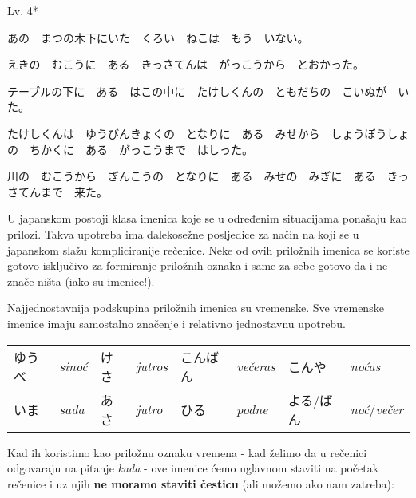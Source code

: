 	\begin{mondai}{Lv. 4*}
		\item あの　まつの木下にいた　くろい　ねこは　もう　いない。
		\item えきの　むこうに　ある　きっさてんは　がっこうから　とおかった。
		\item テーブルの下に　ある　はこの中に　たけしくんの　ともだちの　こいぬが　いた。
		\item たけしくんは　ゆうびんきょくの　となりに　ある　みせから　しょうぼうしょの　ちかくに　ある　がっこうまで　はしった。
		\item 川の　むこうから　ぎんこうの　となりに　ある　みせの　みぎに　ある　きっさてんまで　来た。
	\end{mondai}


\newpage
{}

	
	
	U japanskom postoji klasa imenica koje se u određenim situacijama ponašaju kao prilozi. Takva upotreba ima dalekosežne posljedice za način na koji se u japanskom slažu kompliciranije rečenice. Neke od ovih priložnih imenica se koriste gotovo isključivo za formiranje priložnih oznaka i same za sebe gotovo da i ne znače ništa (iako su imenice!).
	
	Najjednostavnija podskupina priložnih imenica su vremenske. Sve vremenske imenice imaju samostalno značenje i relativno jednostavnu upotrebu.
	
	
	\begin{tabular}{l l l l l l l l}
		ゆうべ & \textit{sinoć} & けさ & \textit{jutros} & こんばん & \textit{večeras} & こんや & \textit{noćas}\\
 		いま & \textit{sada} & あさ & \textit{jutro} & ひる & \textit{podne} & よる/ばん & \textit{noć}/\textit{večer}\\
	\end{tabular}

	\vspace{10pt}
	Kad ih koristimo kao priložnu oznaku vremena - kad želimo da u rečenici odgovaraju na pitanje \textit{kada} - ove imenice ćemo uglavnom staviti na početak rečenice i uz njih \textbf{ne moramo staviti česticu} (ali možemo ako nam zatreba):
	
